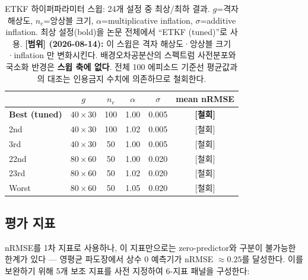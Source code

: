 \documentclass[11pt]{report}
\numberwithin{equation}{chapter}
\numberwithin{figure}{chapter}
\numberwithin{table}{chapter}
\begin{document}
\begin{table}[htbp]
\centering
\caption{ETKF 하이퍼파라미터 스윕: 24개 설정 중 최상/최하 결과.
$g$=격자 해상도, $n_e$=앙상블 크기, $\alpha$=multiplicative inflation,
$\sigma$=additive inflation. 최상 설정(bold)을 논문 전체에서 ``ETKF (tuned)''로 사용.
\textbf{[범위] (2026-08-14):} 이 스윕은 격자 해상도·앙상블 크기·inflation 만 변화시킨다.
배경오차공분산의 스펙트럼 사전분포와 국소화 반경은 \textbf{스윕 축에 없다}.
전체 100 에피소드 기준선 평균값과의 대조는 인용금지 수치에 의존하므로 철회한다.}
\label{tab:etkf_sweep}
\begin{tabular}{lccccc}
\toprule
& $g$ & $n_e$ & $\alpha$ & $\sigma$ & mean nRMSE \\
\midrule
\textbf{Best (tuned)} & $40\times30$ & 100 & 1.00 & 0.005 & \textbf{[철회]} \\
2nd                   & $40\times30$ & 100 & 1.02 & 0.005 & [철회] \\
3rd                   & $40\times30$ &  50 & 1.00 & 0.005 & [철회] \\
\midrule
22nd & $80\times60$ &  50 & 1.00 & 0.020 & [철회] \\
23rd & $80\times60$ &  50 & 1.02 & 0.020 & [철회] \\
Worst & $80\times60$ &  50 & 1.05 & 0.020 & [철회] \\
\bottomrule
\end{tabular}
\end{table}

\subsection{평가 지표}
\label{sec:metrics}

nRMSE를 1차 지표로 사용하나, 이 지표만으로는 zero-predictor와 구분이 불가능한
한계가 있다 --- 영평균 파도장에서 상수 0 예측기가 nRMSE $\approx 0.25$를 달성한다.
이를 보완하기 위해 5개 보조 지표를 사전 지정하여 6-지표 패널을 구성한다:
\end{document}

